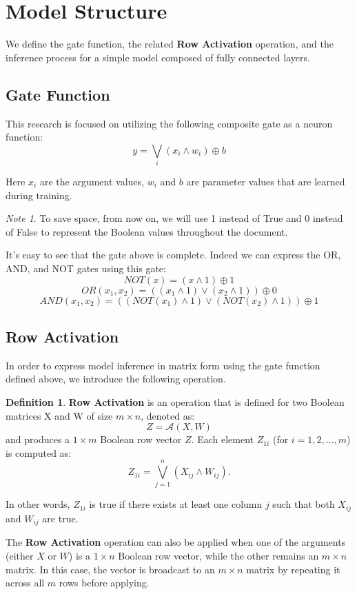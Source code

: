 \documentclass{article}
\theoremstyle{definition}
\newtheorem*{definition}{Definition}
\theoremstyle{remark}
\newtheorem*{note}{Note}
\begin{document}
\section{Model Structure}
We define the gate function, the related \textbf{Row Activation} operation, and the inference process for a simple model composed of fully connected layers.

\subsection{Gate Function}
This research is focused on utilizing the following composite gate as a neuron function:
\[ y = \bigvee_{i} \left( x_{i} \wedge w_{i} \right) \oplus b \]

Here \(x_{i}\) are the argument values, \(w_{i}\) and \(b\) are parameter values that are learned during training.

\begin{note}
    To save space, from now on, we will use 1 instead of True and 0 instead of False to represent the Boolean values throughout the document.
\end{note}

It's easy to see that the gate above is complete. Indeed we can  express the OR, AND, and NOT gates using this gate:
\[ NOT(x) = \left( x \wedge 1 \right) \oplus 1 \]
\[ OR(x_1, x_2) = \left(\left( x_1 \wedge 1 \right) \vee \left( x_2 \wedge 1 \right) \right) \oplus 0 \]
\[ AND(x_1, x_2) = \left(\left( NOT(x_1) \wedge 1 \right) \vee \left( NOT(x_2) \wedge 1 \right) \right) \oplus 1 \]

\subsection{Row Activation}
In order to express model inference in matrix form using the gate function defined above, we introduce the following operation.

\begin{definition}
    \textbf{Row Activation} is an operation that is defined for two Boolean matrices X and W of size \( m \times n \), denoted as:
    \[ Z = \mathcal{A}(X, W) \]
    and produces a \( 1 \times m \) Boolean row vector \( Z \). Each element \( Z_{1i} \) (for \( i = 1, 2, \dots, m \)) is computed as:
    \[ Z_{1i} = \bigvee_{j=1}^{n} \left( X_{ij} \wedge W_{ij} \right). \]

    In other words, \( Z_{1i} \) is true if there exists at least one column \( j \) such that both \( X_{ij} \) and \( W_{ij} \) are true.

    The \textbf{Row Activation} operation can also be applied when one of the arguments (either \( X \) or \( W \)) is a \( 1 \times n \) Boolean row vector, while the other remains an \( m \times n \) matrix. In this case, the vector is broadcast to an \( m \times n \) matrix by repeating it across all \( m \) rows before applying.
\end{definition}
\end{document}
